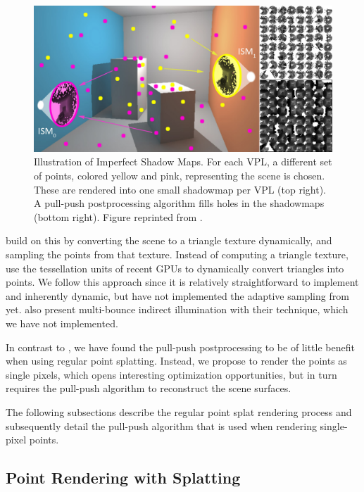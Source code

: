 \begin{figure}[htb]
\centering
    \includegraphics[width=\textwidth]{graphics/ism_ritschel_08}
  \caption{Illustration of Imperfect Shadow Maps. For each VPL, a different set of points, colored yellow and pink, representing the scene is chosen. These are rendered into one small shadowmap per VPL (top right). A pull-push postprocessing algorithm fills holes in the shadowmaps (bottom right). Figure reprinted from \citet{ritschel2008ism}.}
  \label{fig:concept:ism_ritschel_08}
\end{figure}

\citet{ritschel2011ismsViewAdaptive} build on this by converting the scene to a triangle texture dynamically, and sampling the points from that texture. Instead of computing a triangle texture, \citet{barak2013temporally} use the tessellation units of recent GPUs to dynamically convert triangles into points.
We follow this approach since it is relatively straightforward to implement and inherently dynamic, but have not implemented the adaptive sampling from \citet{ritschel2011ismsViewAdaptive} yet.
\citet{ritschel2008ism} also present multi-bounce indirect illumination with their technique, which we have not implemented.

In contrast to \citet{ritschel2008ism}, we have found the pull-push postprocessing to be of little benefit when using regular point splatting. Instead, we propose to render the points as single pixels, which opens interesting optimization opportunities, but in turn requires the pull-push algorithm to reconstruct the scene surfaces.

The following subsections describe the regular point splat rendering process and subsequently detail the pull-push algorithm that is used when rendering single-pixel points.


\subsection{Point Rendering with Splatting}

